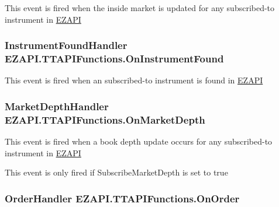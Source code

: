 This event is fired when the inside market is updated for any subscribed-\/to instrument in \hyperlink{namespace_e_z_a_p_i}{E\-Z\-A\-P\-I} 

\hypertarget{class_e_z_a_p_i_1_1_t_t_a_p_i_functions_a3212fe2094af653fbb44b82ec759cad0}{
\subsubsection[{On\-Instrument\-Found}]{\setlength{\rightskip}{0pt plus 5cm}Instrument\-Found\-Handler E\-Z\-A\-P\-I.\-T\-T\-A\-P\-I\-Functions.\-On\-Instrument\-Found}}\label{class_e_z_a_p_i_1_1_t_t_a_p_i_functions_a3212fe2094af653fbb44b82ec759cad0}


This event is fired when an subscribed-\/to instrument is found in \hyperlink{namespace_e_z_a_p_i}{E\-Z\-A\-P\-I} 

\hypertarget{class_e_z_a_p_i_1_1_t_t_a_p_i_functions_aeef24116eebd75f30500949005c2f0b6}{
\subsubsection[{On\-Market\-Depth}]{\setlength{\rightskip}{0pt plus 5cm}Market\-Depth\-Handler E\-Z\-A\-P\-I.\-T\-T\-A\-P\-I\-Functions.\-On\-Market\-Depth}}\label{class_e_z_a_p_i_1_1_t_t_a_p_i_functions_aeef24116eebd75f30500949005c2f0b6}


This event is fired when a book depth update occurs for any subscribed-\/to instrument in \hyperlink{namespace_e_z_a_p_i}{E\-Z\-A\-P\-I} 

This event is only fired if Subscribe\-Market\-Depth is set to true\hypertarget{class_e_z_a_p_i_1_1_t_t_a_p_i_functions_ac44004a93dc41d92a0f91c768761bc81}{
\subsubsection[{On\-Order}]{\setlength{\rightskip}{0pt plus 5cm}Order\-Handler E\-Z\-A\-P\-I.\-T\-T\-A\-P\-I\-Functions.\-On\-Order}}\label{class_e_z_a_p_i_1_1_t_t_a_p_i_functions_ac44004a93dc41d92a0f91c768761bc81}


